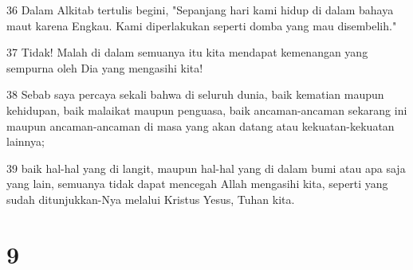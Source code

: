 \par 36 Dalam Alkitab tertulis begini, "Sepanjang hari kami hidup di dalam bahaya maut karena Engkau. Kami diperlakukan seperti domba yang mau disembelih."
\par 37 Tidak! Malah di dalam semuanya itu kita mendapat kemenangan yang sempurna oleh Dia yang mengasihi kita!
\par 38 Sebab saya percaya sekali bahwa di seluruh dunia, baik kematian maupun kehidupan, baik malaikat maupun penguasa, baik ancaman-ancaman sekarang ini maupun ancaman-ancaman di masa yang akan datang atau kekuatan-kekuatan lainnya;
\par 39 baik hal-hal yang di langit, maupun hal-hal yang di dalam bumi atau apa saja yang lain, semuanya tidak dapat mencegah Allah mengasihi kita, seperti yang sudah ditunjukkan-Nya melalui Kristus Yesus, Tuhan kita.

\chapter{9}

